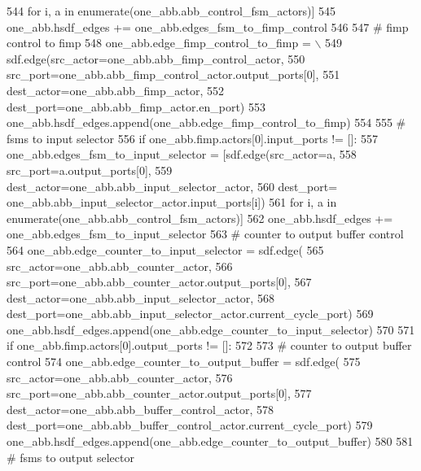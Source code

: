 \begin{DoxyCode}
544          \textcolor{keywordflow}{for} i, a \textcolor{keywordflow}{in} enumerate(one\_abb.abb\_control\_fsm\_actors)]
545     one\_abb.hsdf\_edges += one\_abb.edges\_fsm\_to\_fimp\_control
546 
547     \textcolor{comment}{# fimp control to fimp}
548     one\_abb.edge\_fimp\_control\_to\_fimp = \(\backslash\)
549         sdf.edge(src\_actor=one\_abb.abb\_fimp\_control\_actor,
550                  src\_port=one\_abb.abb\_fimp\_control\_actor.output\_ports[0],
551                  dest\_actor=one\_abb.abb\_fimp\_actor,
552                  dest\_port=one\_abb.abb\_fimp\_actor.en\_port)
553     one\_abb.hsdf\_edges.append(one\_abb.edge\_fimp\_control\_to\_fimp)
554 
555     \textcolor{comment}{# fsms to input selector}
556     \textcolor{keywordflow}{if} one\_abb.fimp.actors[0].input\_ports != []:
557         one\_abb.edges\_fsm\_to\_input\_selector = [sdf.edge(src\_actor=a,
558                                                         src\_port=a.output\_ports[0],
559                                                         dest\_actor=one\_abb.abb\_input\_selector\_actor,
560                                                         dest\_port=
      one\_abb.abb\_input\_selector\_actor.input\_ports[i])
561                                                \textcolor{keywordflow}{for} i, a \textcolor{keywordflow}{in} enumerate(one\_abb.abb\_control\_fsm\_actors)]
562         one\_abb.hsdf\_edges += one\_abb.edges\_fsm\_to\_input\_selector
563         \textcolor{comment}{# counter to output buffer control}
564         one\_abb.edge\_counter\_to\_input\_selector = sdf.edge(
565             src\_actor=one\_abb.abb\_counter\_actor,
566             src\_port=one\_abb.abb\_counter\_actor.output\_ports[0],
567             dest\_actor=one\_abb.abb\_input\_selector\_actor,
568             dest\_port=one\_abb.abb\_input\_selector\_actor.current\_cycle\_port)
569         one\_abb.hsdf\_edges.append(one\_abb.edge\_counter\_to\_input\_selector)
570 
571     \textcolor{keywordflow}{if} one\_abb.fimp.actors[0].output\_ports != []:
572 
573         \textcolor{comment}{# counter to output buffer control}
574         one\_abb.edge\_counter\_to\_output\_buffer = sdf.edge(
575             src\_actor=one\_abb.abb\_counter\_actor,
576             src\_port=one\_abb.abb\_counter\_actor.output\_ports[0],
577             dest\_actor=one\_abb.abb\_buffer\_control\_actor,
578             dest\_port=one\_abb.abb\_buffer\_control\_actor.current\_cycle\_port)
579         one\_abb.hsdf\_edges.append(one\_abb.edge\_counter\_to\_output\_buffer)
580 
581         \textcolor{comment}{# fsms to output selector}

\end{DoxyCode}
